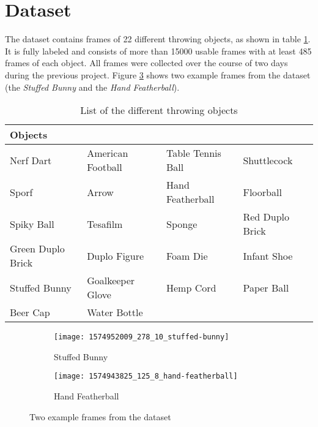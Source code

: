 \section{Dataset}
\label{sec:training_of_the_cnn:dataset}

The dataset contains frames of 22 different throwing objects, as shown in table \ref{tab:objects}.
It is fully labeled and consists of more than \num{15000} usable frames with at least \num{485} frames of each object.
All frames were collected over the course of two days during the previous project.
Figure \ref{fig:dataset} shows two example frames from the dataset (the \textit{Stuffed Bunny} and the \textit{Hand Featherball}).

\begin{table}
  \caption{List of the different throwing objects}
  \label{tab:objects}
  \centering
  \begin{tabular}{llll}
    \toprule
    \textbf{Objects} &  &  &  \\
    \midrule
    Nerf Dart & American Football & Table Tennis Ball & Shuttlecock \\ %
    Sporf & Arrow & Hand Featherball & Floorball \\
    Spiky Ball & Tesafilm & Sponge & Red Duplo Brick \\
    Green Duplo Brick & Duplo Figure & Foam Die & Infant Shoe \\
    Stuffed Bunny & Goalkeeper Glove & Hemp Cord & Paper Ball \\
    Beer Cap & Water Bottle &  &  \\
    \bottomrule
  \end{tabular}
\end{table}

\begin{figure}[t]
  \centering
  \begin{subfigure}[b]{0.45\textwidth}
    \centering
    \texttt{[image: 1574952009\_278\_10\_stuffed-bunny]}
    \caption{Stuffed Bunny}
    \label{subfig:dataset_stuffed_bunny}
  \end{subfigure}
  \begin{subfigure}[b]{0.45\textwidth}
    \centering
    \texttt{[image: 1574943825\_125\_8\_hand-featherball]}
    \caption{Hand Featherball}
    \label{subfig:dataset_hand_featherball}
  \end{subfigure}
  \caption{Two example frames from the dataset}
  \label{fig:dataset}
\end{figure}

